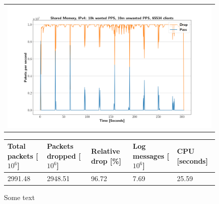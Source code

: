 \begin{figure}[p]
	\label{fig:simplefail2ban:shm:ip4:10m}
	\centering
	\scriptsize
	\begin{tabular}{c}
    	\centerline{\includegraphics[width=1.2\textwidth]{images/simplefail2ban_shm_ipv4_v10k_iv10m_c65534.png}}
	\end{tabular}
	\begin{tabular}{lllll}
		\toprule
		\textbf{Total packets [$10^6$]} & \textbf{Packets dropped [$10^6$]} & \textbf{Relative drop [\%]} & \textbf{Log messages [$10^6$]} & \textbf{CPU [seconds]} \\ \midrule 
		2991.48 & 2948.51 & 96.72 & 7.69 & 25.59 \\
		\bottomrule
	\end{tabular}
	\caption[Simplefail2ban, Shared Memory, IPv4, 10m \ac{PPS}]{Some text}
\end{figure}

